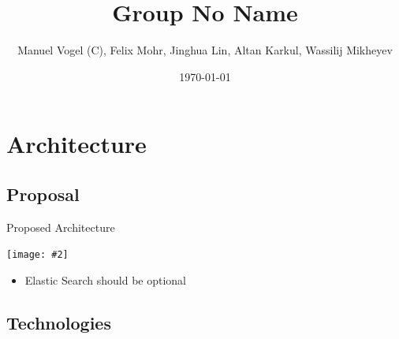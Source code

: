\documentclass{beamer}
\title{Group \textbf{No Name}}
\author[]{Manuel Vogel (C), Felix Mohr,  Jinghua Lin,  Altan Karkul, Wassilij Mikheyev}
\institute{Graphical User Interfaces Lab}
\date{\today}
\newcommand{\cgraphic}[2]
{
	\begin{center}
		\texttt{[image: \#2]}
	\end{center}
}%
\begin{document}
\frame{\titlepage}

\section{Architecture}
\subsection{Proposal}
\begin{frame}{Proposed Architecture}
		\cgraphic{.12}{architecture_proposal}
		\begin{itemize}
			\item Elastic Search should be optional
		\end{itemize}
\end{frame}
\subsection{Technologies}
\end{document}
